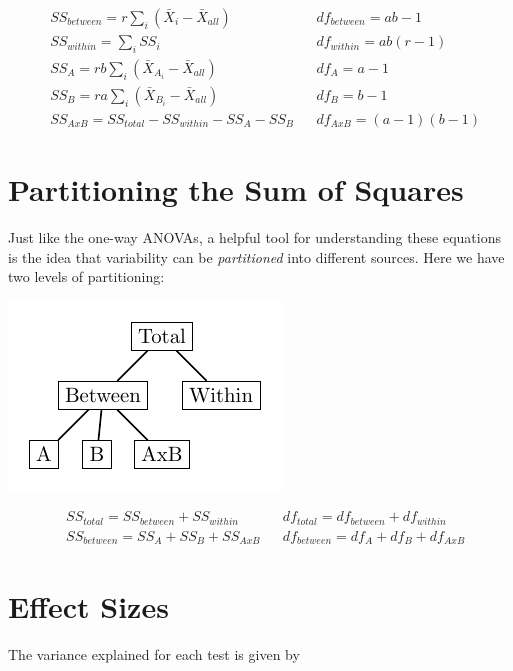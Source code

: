 \documentclass{tufte-handout}
\begin{document}
\begin{align*}
&SS_{between} = r \sum_i \left( \bar{X}_i - \bar{X}_{all} \right) & &df_{between} = ab-1\\
&SS_{within} = \sum_i SS_i & &df_{within} = ab(r-1)\\
&SS_A = rb\sum_{i} \left( \bar{X}_{A_i} - \bar{X}_{all} \right) & &df_A = a-1\\
&SS_B = ra\sum_{i} \left( \bar{X}_{B_i} - \bar{X}_{all} \right) & &df_B = b-1\\
&SS_{AxB}=SS_{total}-SS_{within}-SS_A-SS_B & &df_{AxB} = (a-1)(b-1)
\end{align*}

\section{Partitioning the Sum of Squares}
Just like the one-way ANOVAs, a helpful tool for understanding these equations is the idea that variability can be \emph{partitioned} into different sources. Here we have two levels of partitioning:
\begin{marginfigure}%
  \includegraphics[width=\linewidth]{anova_partition_two_way}%
  \label{fig:fullfig}%
\end{marginfigure}

\begin{align*}
&SS_{total}=SS_{between}+SS_{within} 	&	&df_{total}=df_{between}+df_{within}\\
&SS_{between}=SS_{A}+SS_{B}+SS_{AxB} 	&	&df_{between}=df_{A}+df_{B}+df_{AxB}
\end{align*}

\section{Effect Sizes}
The variance explained for each test is given by
\end{document}
